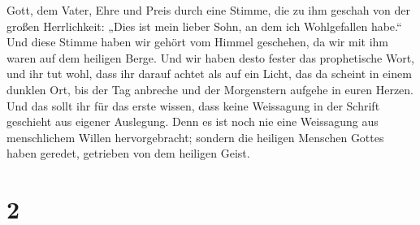 Gott, dem Vater, Ehre und Preis durch eine Stimme, die zu ihm geschah
von der großen Herrlichkeit: „Dies ist mein lieber Sohn, an dem ich
Wohlgefallen habe.``  Und diese Stimme haben wir gehört
vom Himmel geschehen, da wir mit ihm waren auf dem heiligen Berge.
 Und wir haben desto fester das prophetische Wort, und
ihr tut wohl, dass ihr darauf achtet als auf ein Licht, das da scheint
in einem dunklen Ort, bis der Tag anbreche und der Morgenstern aufgehe
in euren Herzen.  Und das sollt ihr für das erste wissen,
dass keine Weissagung in der Schrift geschieht aus eigener Auslegung.
 Denn es ist noch nie eine Weissagung aus menschlichem
Willen hervorgebracht; sondern die heiligen Menschen Gottes haben
geredet, getrieben von dem heiligen Geist.

\hypertarget{section-1}{%
\section{2}\label{section-1}}

